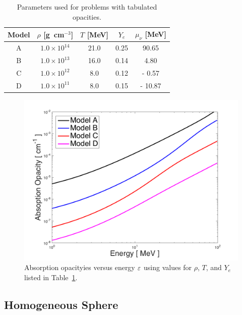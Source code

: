 \documentclass[10pt,preprint]{aastex}
\begin{document}
\begin{table}
  \caption{Parameters used for problems with tabulated opacities. \label{tab:tabulatedModels}}
  \begin{tabular}{ccccc}
    Model & $\rho$ [g~cm$^{-3}$] & $T$ [MeV] & $Y_{e}$ & $\mu_{\nu}$ [MeV] \\
    \midrule \midrule
    A & $1.0\times10^{14}$ & 21.0  & 0.25 &   90.65 \\
    B & $1.0\times10^{13}$ & 16.0 & 0.14 &     4.80 \\
    C & $1.0\times10^{12}$ &   8.0 & 0.12 & -   0.57 \\
    D & $1.0\times10^{11}$ &   8.0 & 0.15 & - 10.87 \\
    \midrule \midrule
  \end{tabular}
\end{table}

\begin{figure}
  \begin{center}
    \includegraphics[scale=0.8]{./Figures/HomogeneousSphere_Opacities}
  \end{center}
  \caption{Absorption opacityies versus energy $\varepsilon$ using values for $\rho$, $T$, and $Y_{e}$ listed in Table~\ref{tab:tabulatedModels}.}
  \label{fig:absorptionOpacities_weaklib}
\end{figure}

\subsection{Homogeneous Sphere}
\end{document}
